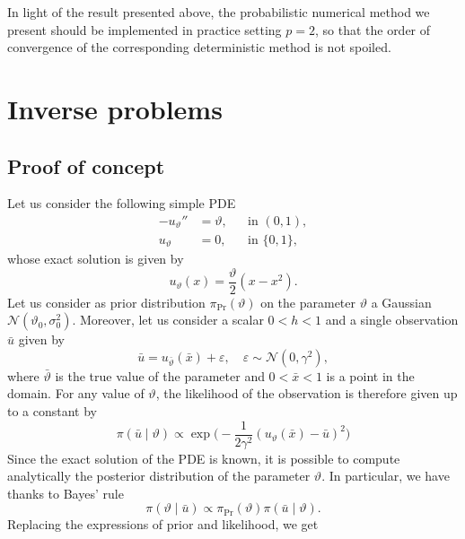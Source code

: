 \documentclass{siamart1116}
\numberwithin{theorem}{section}
\renewcommand{\theta}{\vartheta}
\newcommand{\epl}{\varepsilon}
\begin{document}
\begin{remark} In light of the result presented above, the probabilistic numerical method we present should be implemented in practice setting $p = 2$, so that the order of convergence of the corresponding deterministic method is not spoiled.	
\end{remark}

\section{Inverse problems}
\subsection{Proof of concept} Let us consider the following simple PDE
\begin{equation}\label{eq:TestPDEInverse}
\begin{aligned}
-u_\theta'' &= \theta, && \text{in } (0, 1),\\
u_\theta &= 0, && \text{in } \{0, 1\},
\end{aligned}
\end{equation}
whose exact solution is given by
\begin{equation}
	u_\theta(x) = \frac{\theta}{2}(x - x^2).
\end{equation}
Let us consider as prior distribution $\pi_{\mathrm{Pr}}(\theta)$ on the parameter $\theta$ a Gaussian $\mathcal{N}(\theta_0, \sigma_0^2)$. Moreover, let us consider a scalar $0 < h < 1$ and a single observation $\bar u$ given by
\begin{equation}
	\bar u = u_{\bar \theta}(\bar x) + \epl, \quad \epl \sim \mathcal{N}(0, \gamma^2),
\end{equation}
where $\bar \theta$ is the true value of the parameter and $0 < \bar x < 1$ is a point in the domain. For any value of $\theta$, the likelihood of the observation is therefore given up to a constant by
\begin{equation}
	\pi(\bar u \mid \theta) \propto \exp\Big(-\frac{1}{2\gamma^2}(u_\theta(\bar x) - \bar u )^2 \Big)
\end{equation}
Since the exact solution of the PDE is known, it is possible to compute analytically the posterior distribution of the parameter $\theta$. In particular, we have thanks to Bayes' rule
\begin{equation}
	\pi(\theta \mid \bar u) \propto \pi_{\mathrm{Pr}}(\theta) \pi(\bar u \mid \theta).
\end{equation}
Replacing the expressions of prior and likelihood, we get
\end{document}
